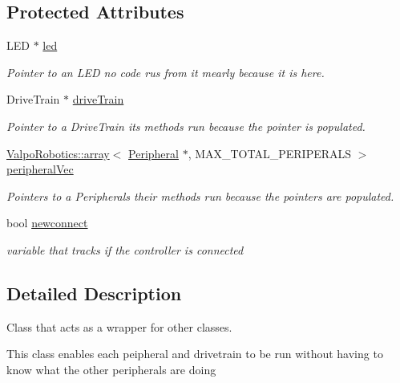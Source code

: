 \subsection*{Protected Attributes}
\begin{DoxyCompactItemize}
\item 
L\+ED $\ast$ \mbox{\hyperlink{class_robot_a28c6c49c9a12c8767e118e0e8a4165cf}{led}}
\begin{DoxyCompactList}\small\item\em Pointer to an L\+ED no code rus from it mearly because it is here. \end{DoxyCompactList}\item 
Drive\+Train $\ast$ \mbox{\hyperlink{class_robot_a4b499841182a38720a26a493fa98363a}{drive\+Train}}
\begin{DoxyCompactList}\small\item\em Pointer to a Drive\+Train its methods run because the pointer is populated. \end{DoxyCompactList}\item 
\mbox{\hyperlink{class_valpo_robotics_1_1array}{Valpo\+Robotics\+::array}}$<$ \mbox{\hyperlink{class_peripheral}{Peripheral}} $\ast$, M\+A\+X\+\_\+\+T\+O\+T\+A\+L\+\_\+\+P\+E\+R\+I\+P\+E\+R\+A\+LS $>$ \mbox{\hyperlink{class_robot_a8db438771a3e7dc9d2cf5dd2e1d25f74}{peripheral\+Vec}}
\begin{DoxyCompactList}\small\item\em Pointers to a Peripherals their methods run because the pointers are populated. \end{DoxyCompactList}\item 
\mbox{\label{class_robot_a19c7a18705cf4bc4359f5ba12c3541d8}} 
bool \mbox{\hyperlink{class_robot_a19c7a18705cf4bc4359f5ba12c3541d8}{newconnect}}
\begin{DoxyCompactList}\small\item\em variable that tracks if the controller is connected \end{DoxyCompactList}\end{DoxyCompactItemize}


\subsection{Detailed Description}
Class that acts as a wrapper for other classes. 

This class enables each peipheral and drivetrain to be run without having to know what the other peripherals are doing

